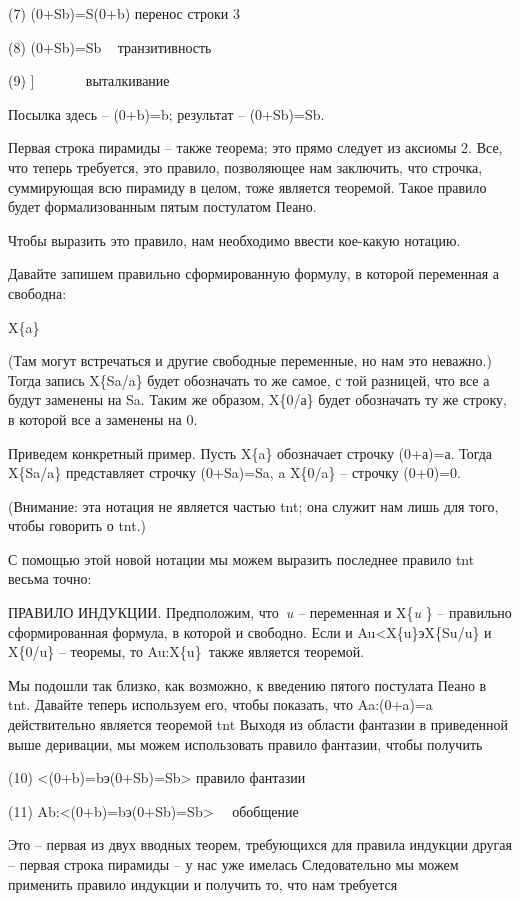 \documentclass[../main.tex]{subfiles}
\begin{document}
(7) (0+Sb)=S(0+b) перенос строки 3

(8) (0+Sb)=Sb ~ транзитивность

(9) {]} ~~~~~~ выталкивание

Посылка здесь \--- (0+b)=b; результат \--- (0+Sb)=Sb.

Первая строка пирамиды \--- также теорема; это прямо следует из аксиомы 2. Все, что теперь требуется, это правило, позволяющее нам заключить, что строчка, суммирующая всю пирамиду в целом, тоже является теоремой. Такое правило будет формализованным пятым постулатом Пеано.

Чтобы выразить это правило, нам необходимо ввести кое-какую нотацию.

Давайте запишем правильно сформированную формулу, в которой переменная а свободна:

X\{a\}

(Там могут встречаться и другие свободные переменные, но нам это неважно.) Тогда запись X\{Sa/a\} будет обозначать то же самое, с той разницей, что все а будут заменены на Sa. Таким же образом, X\{0/а\} будет обозначать ту же строку, в которой все а заменены на 0.

Приведем конкретный пример. Пусть X\{a\} обозначает строчку (0+а)=а. Тогда X\{Sa/a\} представляет строчку (0+Sa)=Sa, a X\{0/a\} \--- строчку (0+0)=0.

(Внимание: эта нотация не является частью \acs{tnt}; она служит нам лишь для того, чтобы говорить о \acs{tnt}.)

С помощью этой новой нотации мы можем выразить последнее правило \acs{tnt} весьма точно:

ПРАВИЛО ИНДУКЦИИ\@. Предположим, что~\emph{u} \--- переменная и X\{\emph{u} \} \--- правильно сформированная формула, в которой и свободно. Если и Au\textless X\{u\}эX\{Su/u\} и X\{0/u\} \--- теоремы, то Au:X\{u\}~также является теоремой.

Мы подошли так близко, как возможно, к введению пятого постулата Пеано в \acs{tnt}. Давайте теперь используем его, чтобы показать, что Aa:(0+a)=a действительно является теоремой \acs{tnt} Выходя из области фантазии в приведенной выше деривации, мы можем использовать правило фантазии, чтобы получить

(10) \textless(0+b)=bэ(0+Sb)=Sb\textgreater{} правило фантазии

(11) Ab:\textless(0+b)=bэ(0+Sb)=Sb\textgreater~~ обобщение

Это \--- первая из двух вводных теорем, требующихся для правила индукции другая \--- первая строка пирамиды \--- у нас уже имелась Следовательно мы можем применить правило индукции и получить то, что нам требуется
\end{document}
